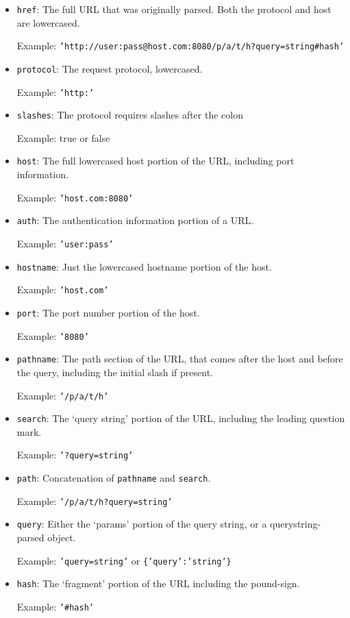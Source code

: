 \begin{itemize}
\item
  \texttt{href}: The full URL that was originally parsed. Both the
  protocol and host are lowercased.

  Example:
  \texttt{'http://user:pass@host.com:8080/p/a/t/h?query=string\#hash'}
\item
  \texttt{protocol}: The request protocol, lowercased.

  Example: \texttt{'http:'}
\item
  \texttt{slashes}: The protocol requires slashes after the colon

  Example: true or false
\item
  \texttt{host}: The full lowercased host portion of the URL, including
  port information.

  Example: \texttt{'host.com:8080'}
\item
  \texttt{auth}: The authentication information portion of a URL.

  Example: \texttt{'user:pass'}
\item
  \texttt{hostname}: Just the lowercased hostname portion of the host.

  Example: \texttt{'host.com'}
\item
  \texttt{port}: The port number portion of the host.

  Example: \texttt{'8080'}
\item
  \texttt{pathname}: The path section of the URL, that comes after the
  host and before the query, including the initial slash if present.

  Example: \texttt{'/p/a/t/h'}
\item
  \texttt{search}: The `query string' portion of the URL, including the
  leading question mark.

  Example: \texttt{'?query=string'}
\item
  \texttt{path}: Concatenation of \texttt{pathname} and \texttt{search}.

  Example: \texttt{'/p/a/t/h?query=string'}
\item
  \texttt{query}: Either the `params' portion of the query string, or a
  querystring-parsed object.

  Example: \texttt{'query=string'} or \texttt{\{'query':'string'\}}
\item
  \texttt{hash}: The `fragment' portion of the URL including the
  pound-sign.

  Example: \texttt{'\#hash'}
\end{itemize}


